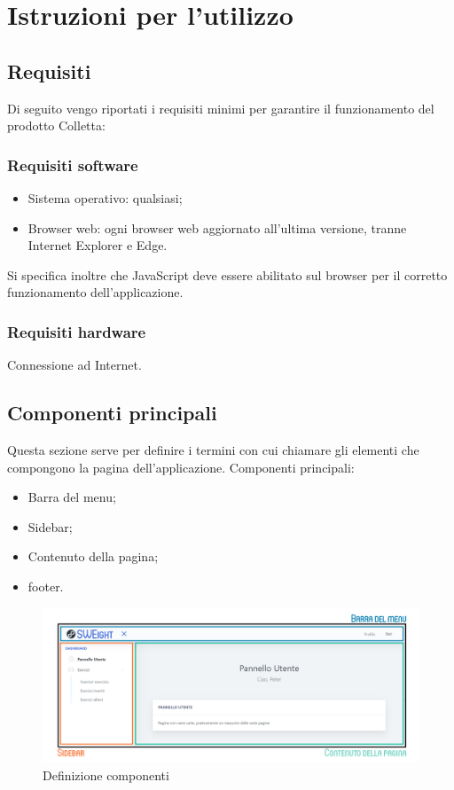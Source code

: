 \section{Istruzioni per l'utilizzo}
\subsection{Requisiti}
Di seguito vengo riportati i requisiti minimi per garantire il funzionamento del prodotto Colletta:
\subsubsection{Requisiti software}
\begin{itemize}
\item {Sistema operativo:} qualsiasi;
\item {Browser web:} ogni browser web aggiornato all'ultima versione, tranne Internet Explorer e Edge.
\end{itemize}
Si specifica inoltre che JavaScript deve essere abilitato sul browser per il corretto funzionamento dell’applicazione.
\subsubsection{Requisiti hardware}
Connessione ad Internet.
\subsection{Componenti principali}
Questa sezione serve per definire i termini con cui chiamare gli elementi che compongono la pagina dell'applicazione.
Componenti principali:
\begin{itemize}
    \item Barra del menu;
    \item {Sidebar};
    \item Contenuto della pagina;
    \item footer.
\end{itemize}

\begin{figure}[H]
    \centering
    \includegraphics[width=17cm]{sez/img/istruzioni/dashboardMod.png} 
    \caption{Definizione componenti}\label{fig:1}
\end{figure}

